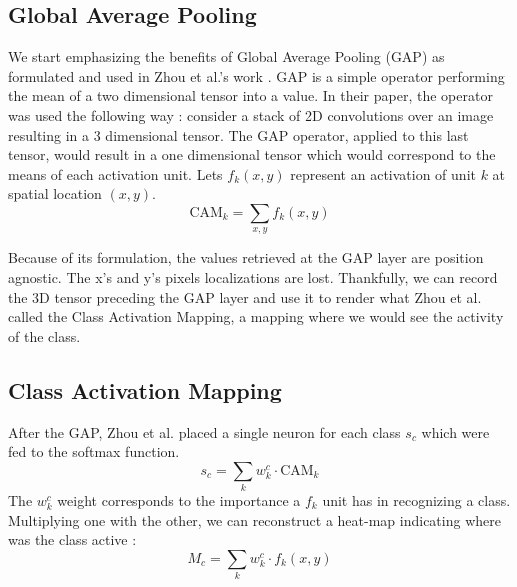 		\subsection{Global Average Pooling}
		\label{sub:global_average_pooling}
			We start emphasizing the benefits of Global Average Pooling (GAP) as formulated and used in Zhou et al.'s work \cite{zhou2015learning}. GAP is a simple operator performing the mean of a two dimensional tensor into a value. In their paper, the operator was used the following way : consider a stack of 2D convolutions over an image resulting in a 3 dimensional tensor. The GAP operator, applied to this last tensor, would result in a one dimensional tensor which would correspond to the means of each activation unit. Lets $f_k(x,y)$ represent an activation of unit $k$ at spatial location $(x,y)$.
			\begin{equation}
				\text{CAM}_k = \sum_{x,y}f_k(x,y)
			\end{equation}

			Because of its formulation, the values retrieved at the GAP layer are position agnostic. The x's and y's pixels localizations are lost. Thankfully, we can record the 3D tensor preceding the GAP layer and use it to render what Zhou et al. called the Class Activation Mapping, a mapping where we would see the activity of the class.

		\subsection{Class Activation Mapping}
		\label{sub:class_activation_mapping}
			After the GAP, Zhou et al. placed a single neuron for each class $s_c$ which were fed to the softmax function. 
			\begin{equation}
				s_c = \sum_k w_k^c \cdot \text{CAM}_k
			\end{equation}
			The $w_k^c$ weight corresponds to the importance a $f_k$ unit has in recognizing a class. Multiplying one with the other, we can reconstruct a heat-map indicating where was the class active :
			\begin{equation}
				M_c = \sum_k w_k^c \cdot f_k(x,y)
			\end{equation}

